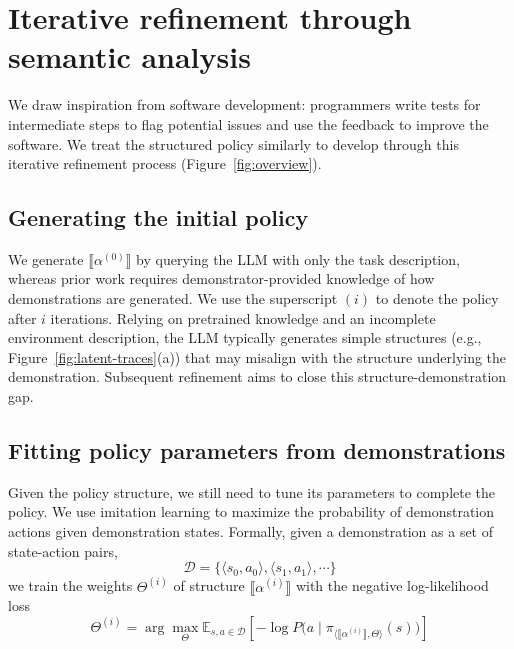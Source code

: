 \section{Iterative refinement through semantic analysis}
\label{sec:method}



We draw inspiration from software development: programmers write tests for intermediate steps to flag potential issues and use the feedback to improve the software. We treat the structured policy similarly to develop through this iterative refinement process (Figure~\ref{fig:overview}).


\subsection{Generating the initial policy}
\label{sec:initial-generation}

We generate $\llbracket \alpha^{(0)} \rrbracket$ by querying the LLM with only the task description, whereas prior work requires demonstrator-provided knowledge of how demonstrations are generated.
We use the superscript $(i)$ to denote the policy after $i$ iterations.
Relying on pretrained knowledge and an incomplete environment description, the LLM typically generates simple structures (e.g., Figure~\ref{fig:latent-traces}(a)) that may misalign with the structure underlying the demonstration.
Subsequent refinement aims to close this structure-demonstration gap.

\subsection{Fitting policy parameters from demonstrations}
\label{sec:fitting}

Given the policy structure, we still need to tune its parameters to complete the policy. We use imitation learning to maximize the probability of demonstration actions given demonstration states.
Formally, given a demonstration as a set of state-action pairs,
\begin{equation}
    \mathcal{D} = \{ \langle s_0, a_0 \rangle, \langle s_1, a_1 \rangle, \cdots \}
\end{equation}
we train the weights $\Theta^{(i)}$ of structure $\llbracket \alpha^{(i)} \rrbracket$ with the negative log-likelihood loss \cite{osa2018algorithmic}
\begin{equation}
    \Theta^{(i)} = \arg\max_\Theta \mathbb{E}_{s, a \in \mathcal{D}} [- \log P\big(a \mid \pi_{\langle \llbracket\alpha^{(i)}\rrbracket, \Theta\rangle}(s)\big)]
\end{equation}

